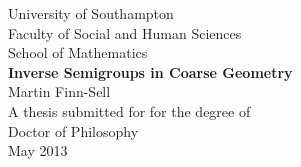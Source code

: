 \begin{titlepage}
\begin{center}

\huge University of Southampton \\[1cm]

\large Faculty of Social and Human Sciences \\[0.5cm]
\LARGE School of Mathematics \\[2cm]
\huge \textbf{Inverse Semigroups in Coarse Geometry} \\[2.5cm]

\Large Martin Finn-Sell\\[2cm]

\large A thesis submitted for for the degree of\\
Doctor of Philosophy\\[8cm]

\large May 2013

\end{center}
\end{titlepage}